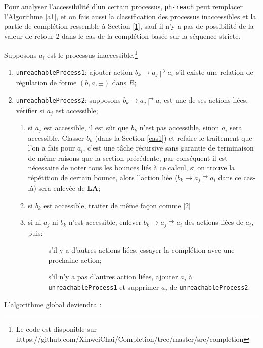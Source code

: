 \documentclass[11pt]{report}
\theoremstyle{definition}
\newcommand{\ac}[3]{$#1\to#2\Rsh#3$}
\begin{document}
Pour analyser l'accessibilit\'e d'un certain processus, \texttt{ph-reach} peut remplacer l'Algorithme \ref{a1}, et on fais aussi la classification des processus inaccessibles et la partie de compl\'etion ressemble \`a Section \ref{1}, sauf il n'y a pas de possibilit\'e de la valeur de retour 2 dans le cas de la compl\'etion bas\'ee sur la s\'equence stricte.

Supposons $a_i$ est le processus inaccessible.\footnote{Le code est disponible sur https://github.com/XinweiChai/Completion/tree/master/src/completion}
	\begin{enumerate}[label=\arabic*,align=left]
		\item \texttt{unreachableProcess1}: ajouter action $b_k\rightarrow a_j\Rsh a_i$ s'il existe une relation de r\'egulation de forme $(b,a,\pm)$ dans $R$;		
		\item \texttt{unreachableProcess2}: supposons $b_k\rightarrow a_j\Rsh a_i$ est une de ses actions li\'ees, v\'erifier si $a_j$ est accessible;
		\begin{enumerate}[label=\roman*,align=left]
			\item \label{2}si $a_j$ est accessible, il est s\^ur que $b_k$ n'est pas accessible, sinon $a_i$ sera accessible. Classer $b_k$ (dans la Section \ref{cas1}) et refaire le traitement que l'on a fais pour $a_i$, c'est une t\^ache r\'ecursive sans garantie de terminaison de m\^eme raisons que la section pr\'ec\'edente, par cons\'equent il est n\'ecessaire de noter tous les bounces li\'es \`a ce calcul, si on trouve la r\'ep\'etition de certain bounce, alors l'action li\'ee (\ac{b_k}{a_j}{a_i} dans ce cas-l\`a) sera enlev\'ee de $\mathbf{LA}$;
			\item si $b_k$ est accessible, traiter de m\^eme fa\c con comme \ref{2}
			\item si ni $a_j$ ni $b_k$ n'est accessible, enlever $b_k\rightarrow a_j\Rsh a_i$ des actions li\'ees de $a_i$, puis:
			\begin{description}
				\item[\quad] s'il y a d'autres actions li\'ees, essayer la compl\'etion avec une prochaine action;
				\item[\quad] s'il n'y a pas d'autres action li\'ees, ajouter $a_j$ \`a \texttt{unreachableProcess1} et supprimer $a_j$ de \texttt{unreachableProcess2}.
			\end{description}
		\end{enumerate}
	\end{enumerate}

L'algorithme global deviendra :
\end{document}

